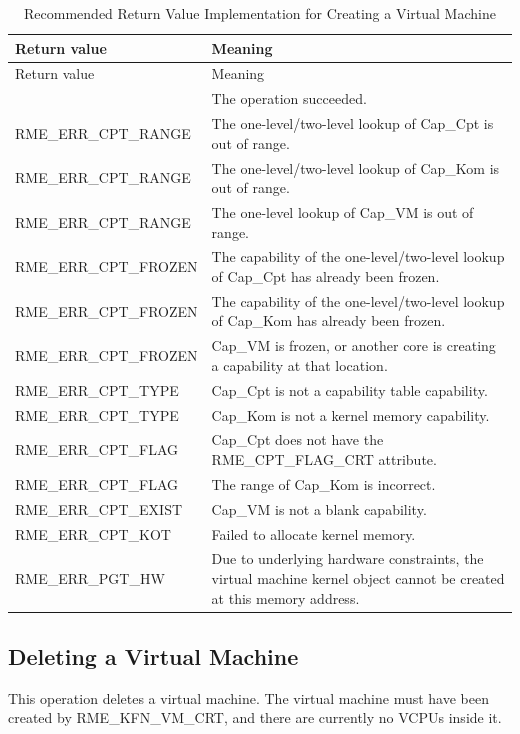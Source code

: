 \begin{xltabular}{\textwidth}{@{}>{\hsize\raggedright\arraybackslash}X>{\hsize\raggedright\arraybackslash}X@{}}
\caption{Recommended Return Value Implementation for Creating a Virtual Machine}\label{tab:8-74-create-virtual-machine-suggested-return-values}\\
\toprule
Return value & Meaning\tabularnewline
\endfirsthead
\toprule
Return value & Meaning\tabularnewline
\midrule
\endhead
\bottomrule
{} & The operation succeeded.\tabularnewline
    RME\_ERR\_CPT\_RANGE & The one-level/two-level lookup of Cap\_Cpt is out of range.\tabularnewline
    RME\_ERR\_CPT\_RANGE & The one-level/two-level lookup of Cap\_Kom is out of range.\tabularnewline
    RME\_ERR\_CPT\_RANGE & The one-level lookup of Cap\_VM is out of range.\tabularnewline
    RME\_ERR\_CPT\_FROZEN & The capability of the one-level/two-level lookup of Cap\_Cpt has already been frozen.\tabularnewline
    RME\_ERR\_CPT\_FROZEN & The capability of the one-level/two-level lookup of Cap\_Kom has already been frozen.\tabularnewline
    RME\_ERR\_CPT\_FROZEN & Cap\_VM is frozen, or another core is creating a capability at that location.\tabularnewline
    RME\_ERR\_CPT\_TYPE & Cap\_Cpt is not a capability table capability.\tabularnewline
    RME\_ERR\_CPT\_TYPE & Cap\_Kom is not a kernel memory capability.\tabularnewline
    RME\_ERR\_CPT\_FLAG & Cap\_Cpt does not have the RME\_CPT\_FLAG\_CRT attribute.\tabularnewline
    RME\_ERR\_CPT\_FLAG & The range of Cap\_Kom is incorrect.\tabularnewline
    RME\_ERR\_CPT\_EXIST & Cap\_VM is not a blank capability.\tabularnewline
    RME\_ERR\_CPT\_KOT & Failed to allocate kernel memory.\tabularnewline
    RME\_ERR\_PGT\_HW & Due to underlying hardware constraints, the virtual machine kernel object cannot be created at this memory address.\tabularnewline
\end{xltabular}
\nopagebreak[4]

\subsection{Deleting a Virtual Machine}\label{subsec:8-delete-virtual-machine}

This operation deletes a virtual machine. The virtual machine must have been created by RME\_KFN\_VM\_CRT, and there are currently no VCPUs inside it.


